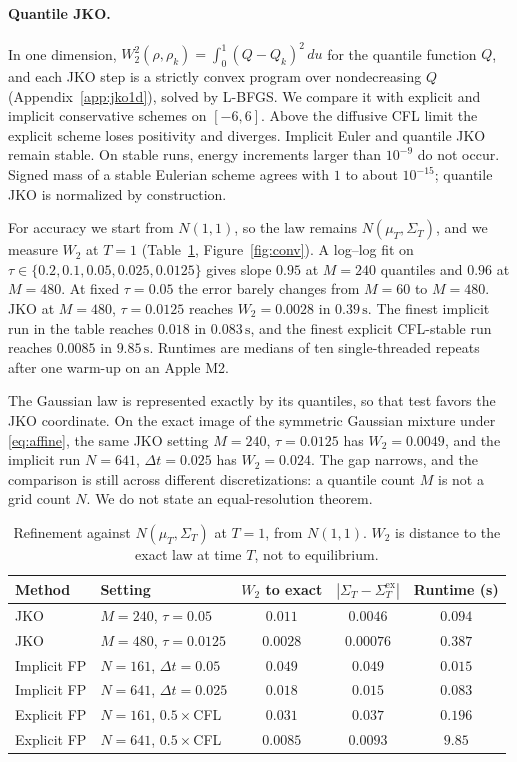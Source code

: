 \documentclass[anon,11pt]{alt2027}
\newcommand{\Wtwo}{W_2}
\begin{document}
\paragraph{Quantile JKO.}
In one dimension, $\Wtwo^2(\rho,\rho_k)=\int_0^1(Q-Q_k)^2\,du$ for the quantile
function $Q$, and each JKO step is a strictly convex program over nondecreasing
$Q$ (Appendix~\ref{app:jko1d}), solved by L-BFGS. We compare it with explicit
and implicit conservative schemes on $[-6,6]$. Above the diffusive CFL limit the
explicit scheme loses positivity and diverges. Implicit Euler and quantile JKO
remain stable. On stable runs, energy increments larger than $10^{-9}$ do not
occur. Signed mass of a stable Eulerian scheme agrees with $1$ to about
$10^{-15}$; quantile JKO is normalized by construction.

For accuracy we start from $N(1,1)$, so the law remains
$N(\mu_T,\Sigma_T)$, and we measure $W_2$ at $T=1$
(Table~\ref{tab:conv}, Figure~\ref{fig:conv}). A log--log fit on
$\tau\in\{0.2,0.1,0.05,0.025,0.0125\}$ gives slope $0.95$ at $M=240$ quantiles
and $0.96$ at $M=480$. At fixed $\tau=0.05$ the error barely changes from
$M=60$ to $M=480$. JKO at $M=480$, $\tau=0.0125$ reaches $W_2=0.0028$ in
$0.39\,\mathrm{s}$. The finest implicit run in the table reaches $0.018$ in
$0.083\,\mathrm{s}$, and the finest explicit CFL-stable run reaches $0.0085$ in
$9.85\,\mathrm{s}$. Runtimes are medians of ten single-threaded repeats after
one warm-up on an Apple M2.

The Gaussian law is represented exactly by its quantiles, so that test favors
the JKO coordinate. On the exact image of the symmetric Gaussian mixture under
\eqref{eq:affine}, the same JKO setting $M=240$, $\tau=0.0125$ has $W_2=0.0049$,
and the implicit run $N=641$, $\Delta t=0.025$ has $W_2=0.024$. The gap narrows,
and the comparison is still across different discretizations: a quantile count
$M$ is not a grid count $N$. We do not state an equal-resolution theorem.

\begin{table}[htbp]
\centering
\caption{Refinement against $N(\mu_T,\Sigma_T)$ at $T=1$, from $N(1,1)$.
$W_2$ is distance to the exact law at time $T$, not to equilibrium.}
\label{tab:conv}
\small
\begin{tabular}{llccc}
\toprule
Method & Setting & $W_2$ to exact & $|\Sigma_T-\Sigma_T^{\mathrm{ex}}|$ & Runtime (s)\\
\midrule
JKO & $M=240$, $\tau=0.05$ & $0.011$ & $0.0046$ & $0.094$\\
JKO & $M=480$, $\tau=0.0125$ & $0.0028$ & $0.00076$ & $0.387$\\
Implicit FP & $N=161$, $\Delta t=0.05$ & $0.049$ & $0.049$ & $0.015$\\
Implicit FP & $N=641$, $\Delta t=0.025$ & $0.018$ & $0.015$ & $0.083$\\
Explicit FP & $N=161$, $0.5\times$CFL & $0.031$ & $0.037$ & $0.196$\\
Explicit FP & $N=641$, $0.5\times$CFL & $0.0085$ & $0.0093$ & $9.85$\\
\bottomrule
\end{tabular}
\end{table}
\end{document}
